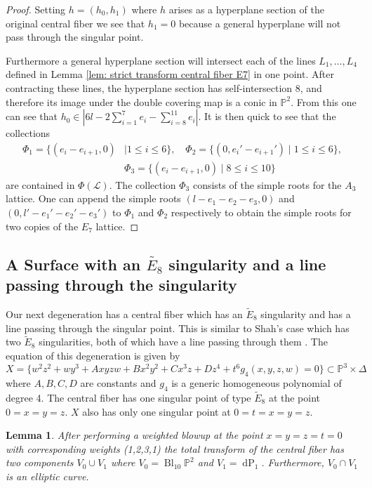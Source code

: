 \documentclass[a4paper]{amsart}
\theoremstyle{definition}
\theoremstyle{plain}
\newtheorem{lemma}[defn]{Lemma}
\theoremstyle{remark}
\newcommand{\PS}{\mathbb{P}}
\begin{document}
\begin{proof}
Setting $h=(h_0,h_1)$ where $h$ arises as a hyperplane section of the original central fiber we see that $h_1=0$ because a general hyperplane will not pass through the singular point.

Furthermore a general hyperplane section will intersect each of the lines $L_1,\dots,L_4$ defined in Lemma \ref{lem: strict transform central fiber E7} in one point. After contracting these lines, the hyperplane section has self-intersection 8, and therefore its image under the double covering map is a conic in $\PS^2$. From this one can see that $h_0 \in |6l-2\sum_{i=1}^7e_i-\sum_{i=8}^{11}e_i|$. It is then quick to see that the collections
\begin{align*}
\Phi_1 = \{(e_i-e_{i+1},0) &\mid 1\leq i\leq 6\}, \quad  \Phi_2 = \{(0,e_i'-e_{i+1}') \mid 1\leq i\leq 6\},\\
&\Phi_3 = \{(e_i-e_{i+1},0) \mid 8\leq i\leq 10\}
\end{align*}
are contained in $\Phi(\mathscr{L})$. The collection $\Phi_3$ consists of the simple roots for the $A_3$ lattice. One can append the simple roots $(l-e_1-e_2-e_3,0)$ and $(0,l'-e_1'-e_2'-e_3')$ to $\Phi_1$ and $\Phi_2$ respectively to obtain the simple roots for two copies of the $E_7$ lattice.
\end{proof}

\subsection{A Surface with an $\widetilde{E_8}$ singularity and a line passing through the singularity}\label{sect: E8 singularity and a line}
Our next degeneration has a central fiber which has an $\widetilde{E}_8$ singularity and has a line passing through the singular point. This is similar to Shah's case \cite[SS-1.1]{Shah81} which has two $\widetilde{E}_8$ singularities, both of which have a line passing through them . The equation of this degeneration is given by
$$X = \{ w^2z^2+wy^3+Axyzw+Bx^2y^2+Cx^3z+Dz^4+t^6g_4(x,y,z,w)=0\}\subset \PS^3 \times \Delta$$
where $A,B,C,D$ are constants and $g_4$ is a generic homogeneous polynomial of degree 4. The central fiber has one singular point of type $\widetilde{E}_8$ at the point $0=x=y=z$. $X$ also has only one singular point at $0=t=x=y=z$.

\begin{lemma}
After performing a weighted blowup at the point $x=y=z=t=0$ with corresponding weights (1,2,3,1) the total transform of the central fiber has two components $V_0 \cup V_1$ where $V_0 = \operatorname{Bl}_{10}\PS^2$ and $V_1=\operatorname{dP}_{1}$. Furthermore, $V_0 \cap V_1$ is an elliptic curve.
\end{lemma}
\end{document}
